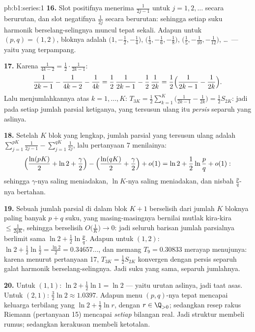 \begin{solution}{pb:b1:series:1}
\textbf{16.} Slot positifnya menerima $\frac{1}{2j-1}$ untuk
$j = 1, 2, \dots$ secara berurutan, dan slot negatifnya $\frac{1}{2j}$ secara
berurutan: sehingga setiap suku  harmonik berselang-selingnya muncul
tepat sekali. Adapun untuk $(p, q) = (1, 2)$, bloknya adalah
$\bigl(1, -\frac12, -\frac14\bigr)$, $\bigl(\frac13, -\frac16,
-\frac18\bigr)$, $\bigl(\frac15, -\frac1{10},
-\frac1{12}\bigr)$, \dots\ --- yaitu  yang terpampang.

\textbf{17.} Karena $\frac{1}{4k-2} = \frac12\cdot\frac{1}{2k-1}$:
\[
\frac{1}{2k-1} - \frac{1}{4k-2} - \frac{1}{4k}
= \frac12\,\frac{1}{2k-1} - \frac12\,\frac{1}{2k}
= \frac12\Bigl(\frac{1}{2k-1} - \frac{1}{2k}\Bigr).
\]
Lalu menjumlahkannya atas $k = 1, \dots, K$: $T_{3K} = \frac12
\sum_{k=1}^{K}\bigl(\frac{1}{2k-1} - \frac{1}{2k}\bigr) =
\frac12 S_{2K}$: jadi pada setiap jumlah parsial ketiganya, 
yang tersusun ulang itu \emph{persis} separuh yang aslinya.

\textbf{18.} Setelah $K$ blok yang lengkap, jumlah parsial yang
tersusun ulang adalah $\sum_{j=1}^{pK}\frac{1}{2j-1} -
\sum_{j=1}^{qK}\frac{1}{2j}$, lalu pertanyaan 7 menilainya:
\[
\Bigl(\frac{\ln(pK)}{2} + \ln 2 + \frac\gamma2\Bigr)
- \Bigl(\frac{\ln(qK)}{2} + \frac\gamma2\Bigr) + o(1)
= \ln 2 + \frac12\ln\frac pq + o(1) :
\]
sehingga $\gamma$-nya saling meniadakan, $\ln K$-nya saling meniadakan, dan nisbah
$\frac pq$-nya bertahan.

\textbf{19.} Sebuah jumlah parsial di dalam blok $K + 1$ berselisih dari
jumlah $K$ bloknya paling banyak $p + q$ suku, yang masing-masingnya bernilai mutlak
kira-kira $\leq \frac{1}{2qK}$, sehingga berselisih $O\bigl(\frac1K\bigr) \to 0$:
jadi seluruh barisan jumlah parsialnya berlimit sama $\ln 2 +
\frac12\ln\frac pq$. Adapun untuk $(1, 2)$: $\ln 2 + \frac12\ln\frac12 =
\frac{\ln 2}{2} = 0.34657\dots$, dan memang $T_9 = 0.30833$
merayap menujunya: karena menurut pertanyaan 17, $T_{3K} = \frac12 S_{2K}$
konvergen dengan persis separuh galat harmonik berselang-selingnya.
Jadi suku yang sama, separuh jumlahnya.

\textbf{20.} Untuk $(1,1)$: $\ln 2 + \frac12\ln 1 = \ln 2$ --- yaitu
urutan aslinya, jadi taat asas. Untuk $(2,1)$: $\frac32\ln 2 \approx
1.0397$. Adapun menu $(p,q)$-nya tepat mencapai keluarga
terbilang yang  $\ln 2 + \frac12\ln r$, dengan $r \in \Q_{>0}$; sedangkan resep
rakus Riemann (pertanyaan 15) mencapai \emph{setiap} bilangan real. Jadi struktur membeli
rumus; sedangkan kerakusan membeli ketotalan.


\end{solution}
